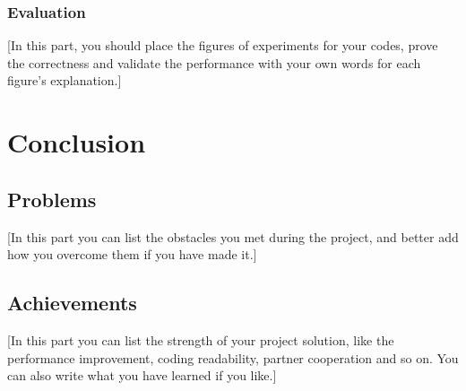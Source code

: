 \documentclass{article}
\begin{document}
\subsubsection{Evaluation}

[In this part, you should place the figures of experiments for your codes, prove the correctness and validate the performance with your own words for each figure’s explanation.]

\section{Conclusion}

\subsection{Problems}

[In this part you can list the obstacles you met during the project, and better add how you overcome them if you have made it.]

\subsection{Achievements}

[In this part you can list the strength of your project solution, like the performance improvement, coding readability, partner cooperation and so on. You can also write what you have learned if you like.]



\end{document}
